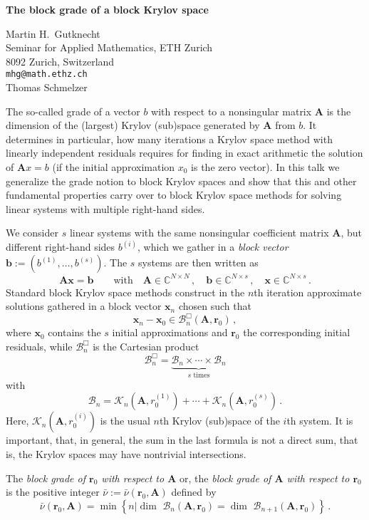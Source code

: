 \documentclass{report}
\newcommand{\Cplex}{\mathbb{C}}
\newcommand{\calB}{{\mathcal B}}
\newcommand{\calBB}{{\mathcal B}^{\Box}}
\newcommand{\calK}{\mathcal{K}}
\newcommand{\bfA}{{\mathbf A}}
\newcommand{\bfb}{{\mathbf b}}
\newcommand{\bfr}{{\mathbf r}}
\newcommand{\bfx}{{\mathbf x}}
\newcommand{\Dim}{\mathop{\mathrm{dim\ }}}
\begin{document}

\begin{center}
{\large
{\bf The block grade of a block Krylov space}}

	Martin H.~Gutknecht \\
	Seminar for Applied Mathematics, ETH Zurich \\
	8092 Zurich, Switzerland \\
	{\tt mhg@math.ethz.ch} \\
	Thomas Schmelzer
\end{center}
The so-called grade of a
vector $b$ with respect to a nonsingular matrix $\bfA$ is
the dimension of the (largest) Krylov (sub)space generated
by $\bfA$ from $b$. It determines in particular, how many
iterations a Krylov space method with linearly independent
residuals requires for finding in exact arithmetic the
solution of $\bfA x=b$ (if the initial approximation $x_0$
is the zero vector). In this talk we generalize the grade
notion to block Krylov spaces and show that this and other
fundamental properties carry over to block Krylov space
methods for solving linear systems with multiple right-hand
sides.

We consider $s$ linear systems with the same
nonsingular coefficient matrix $\bfA$, but different
right-hand sides $b^{(i)}$, which we gather in a
\textit{block vector}
$\bfb := (b^{(1)},\dots,b^{(s)})$.
The $s$ systems are then written as
$$
\bfA \bfx = \bfb \qquad
\text{with} \quad \bfA \in \Cplex^{N\times N}\,,
\quad \bfb \in
\Cplex^{N\times s}\,,\quad
\bfx \in \Cplex^{N\times s}\,.
$$
Standard block Krylov space methods
construct in the $n$th iteration approximate solutions
gathered in a block vector $\bfx_n$ chosen such that
$$
\bfx_n - \bfx_0 \in \calBB_n
(\bfA, \bfr_0) \,,
$$
where $\bfx_0$
contains the $s$ initial approximations and $\bfr_0$ the
corresponding initial residuals, while
$\calBB_n$ is the
Cartesian product
$$
\calBB_n = \underbrace{\calB_n
\times \cdots \times
\calB_n}_{s\text{ times}}
$$
with
$$
\calB_n = \calK_n (\bfA,
r_0^{(1)}) + \cdots + \calK_n
(\bfA, r_0^{(s)}) \,.
$$
Here, $\calK_n (\bfA, r_0^{(i)})$
is the
usual $n$th Krylov (sub)space of the $i$th system. It is
important, that, in general, the sum in the last formula is
not a direct sum, that is, the Krylov spaces may have
nontrivial intersections.

The \textit{block grade of\/
$\bfr_0$ with respect to\/ $\bfA$} or, the
\textit{block grade of\/ $\bfA$
with respect to\/ $\bfr_0$}
is the positive integer
$\bar\nu := \bar\nu(\bfr_0,\bfA)$
defined by
$$
\bar\nu(\bfr_0,\bfA) = \min \left\{n \big\vert
\Dim
\calB_n(\bfA, \bfr_0) =
\Dim
\calB_{n+1}(\bfA, \bfr_0)
\right\}\,.
$$
\end{document}

